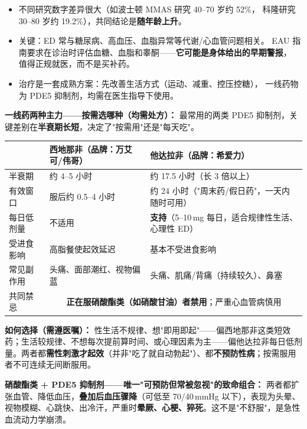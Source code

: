 \documentclass[12pt,UTF8,openany]{ctexbook}
\begin{document}
\begin{itemize}[leftmargin=2em]
  \item 不同研究数字差异很大（如波士顿 MMAS 研究 40--70 岁约 52\%，
        科隆研究 30--80 岁约 19.2\%），共同结论是\textbf{随年龄上升}。
  \item 关键：ED 常与糖尿病、高血压、血脂异常等代谢/心血管问题相关。
        EAU 指南要求在诊治时评估血糖、血脂和睾酮——\textbf{它可能是身体给出的早期警报}，
        值得正规就医，而不是买补药。
  \item 治疗是一套成熟方案：先改善生活方式（运动、减重、控压控糖），
        一线药物为 PDE5 抑制剂，均需在医生指导下使用。
\end{itemize}

\textbf{一线药两种主力——按需选哪种（均需处方）：} 最常用的两类 PDE5 抑制剂，关键差别在\textbf{半衰期长短}，决定了"按需用"还是"每天吃"。

\begin{tabularx}{\textwidth}{l X X}
\toprule
& 西地那非（品牌：万艾可/伟哥） & 他达拉非（品牌：希爱力） \\
\midrule
半衰期 & 约 4--5 小时 & 约 17.5 小时（长 3 倍以上） \\
有效窗口 & 服后约 0.5--4 小时 & 约 24 小时（"周末药/假日药"，一天内随时可用） \\
每日低剂量 & 不适用 & \textbf{支持}（5--10\,mg 每日，适合规律性生活、心理性 ED） \\
受进食影响 & 高脂餐使起效延迟 & 基本不受进食影响 \\
常见副作用 & 头痛、面部潮红、视物偏蓝 & 头痛、肌痛/背痛（持续较久）、鼻塞 \\
\midrule
共同禁忌 & \multicolumn{2}{c}{\textbf{正在服硝酸酯类（如硝酸甘油）者禁用}；严重心血管病慎用} \\
\bottomrule
\end{tabularx}

\textbf{如何选择（需遵医嘱）：} 性生活不规律、想"即用即起"——偏西地那非这类短效药；生活较规律、不想每次提前算时间、或心理因素为主——偏他达拉非每日低剂量。两者都\textbf{需性刺激才起效}（并非"吃了就自动勃起"）、都\textbf{不预防性病}；按需服用者不可连续无间断服用。

\textbf{硝酸酯类 + PDE5 抑制剂——唯一"可预防但常被忽视"的致命组合：} 两者都扩张血管、降低血压，\textbf{叠加后血压骤降}（可低至 70/40\,mmHg 以下），表现为头晕、视物模糊、心跳快、出冷汗，严重时\textbf{晕厥、心梗、猝死}。这不是"不舒服"，是急性血流动力学崩溃。
\end{document}
